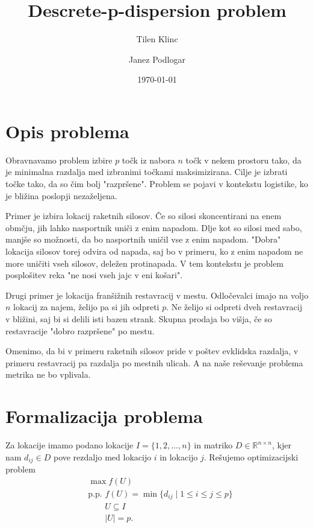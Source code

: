 \documentclass{amsart}
\title{Descrete-p-dispersion problem}
\author{Tilen Klinc}
\author{Janez Podlogar}
\date{\today}
\begin{document}
    
\maketitle

\section{Opis problema}

Obravnavamo problem izbire $ p $ točk iz nabora $ n $ točk v nekem prostoru
tako, da je minimalna razdalja med izbranimi točkami maksimizirana. Cilje je
izbrati točke tako, da so čim bolj "razpršene". Problem se pojavi v kontekstu
logistike, ko je bližina poslopji nezaželjena.


Primer je izbira lokacij raketnih silosov. Če so silosi skoncentirani na enem
obmčju, jih lahko nasportnik uniči z enim napadom. Dlje kot so silosi med sabo,
manjše so možnosti, da bo nasportnih uničil vse z enim napadom. "Dobra" lokacija
silosov torej odvira od napada, saj bo v primeru, ko z enim napadom ne more uničiti
vseh silosov, deležen protinapada. V tem kontekstu je problem posplošitev reka 
"ne nosi vseh jajc v eni košari".

Drugi primer je lokacija franšižnih restavracij v mestu. Odločevalci imajo na voljo $ n $
lokacij za najem, želijo pa si jih odpreti $ p $. Ne želijo si odpreti dveh restavracij
v bližini, saj bi si delili isti bazen strank. Skupna prodaja bo višja, če so restavracije
"dobro razpršene" po mestu.

Omenimo, da bi v primeru raketnih silosov pride v poštev evklidska razdalja, v primeru
restavracij pa razdalja po mestnih ulicah. A na naše reševanje problema metrika ne bo 
vplivala.

\section{Formalizacija problema}

Za lokacije imamo podano lokacije $ I = \{ 1, 2, \ldots, n \} $ in matriko $ D \in 
\mathbb{R}^{n \times n} $, kjer nam $ d_{ij} \in D $ pove rezdaljo med lokacijo $ i $
in lokacijo $ j $. Rešujemo optimizacijski problem
\begin{align*}
    & \max f(U) \\
    & \text{p.p. } f(U) = \min \{ d_{ij} \mid 1 \leq i \leq j \leq p \} \\
    & \qquad U \subseteq I \\
    & \qquad |U| = p .
\end{align*}
\end{document}
